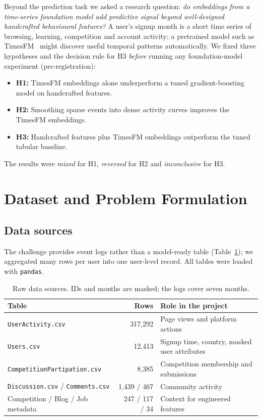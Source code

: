 \documentclass[11pt,a4paper]{article}
\begin{document}
Beyond the prediction task we asked a research question: \emph{do embeddings from a time-series foundation
model add predictive signal beyond well-designed handcrafted behavioural features?} A user's signup month is
a short time series of browsing, learning, competition and account activity; a pretrained model such as
TimesFM~\citep{das2024timesfm,timesfm3} might discover useful temporal patterns automatically. We fixed three
hypotheses and the decision rule for H3 \emph{before} running any foundation-model experiment
(pre-registration):
\begin{itemize}
  \item \textbf{H1:} TimesFM embeddings alone underperform a tuned gradient-boosting model on handcrafted features.
  \item \textbf{H2:} Smoothing sparse events into dense activity curves improves the TimesFM embeddings.
  \item \textbf{H3:} Handcrafted features plus TimesFM embeddings outperform the tuned tabular baseline.
\end{itemize}
The results were \emph{mixed} for H1, \emph{reversed} for H2 and \emph{inconclusive} for H3.

\section{Dataset and Problem Formulation}
\subsection{Data sources}
The challenge provides event logs rather than a model-ready table (Table~\ref{tab:sources}); we aggregated
many rows per user into one user-level record. All tables were loaded with \texttt{pandas}.

\begin{table}[H]
\centering\small
\begin{tabularx}{0.9\linewidth}{lrX}
\toprule
Table & Rows & Role in the project\\
\midrule
\texttt{UserActivity.csv} & 317{,}292 & Page views and platform actions\\
\texttt{Users.csv} & 12{,}413 & Signup time, country, masked user attributes\\
\texttt{CompetitionPartipation.csv} & 8{,}385 & Competition membership and submissions\\
\texttt{Discussion.csv} / \texttt{Comments.csv} & 1{,}439 / 467 & Community activity\\
Competition / Blog / Job metadata & 247 / 117 / 34 & Context for engineered features\\
\bottomrule
\end{tabularx}
\caption{Raw data sources. IDs and months are masked; the logs cover seven months.}
\label{tab:sources}
\end{table}
\end{document}
